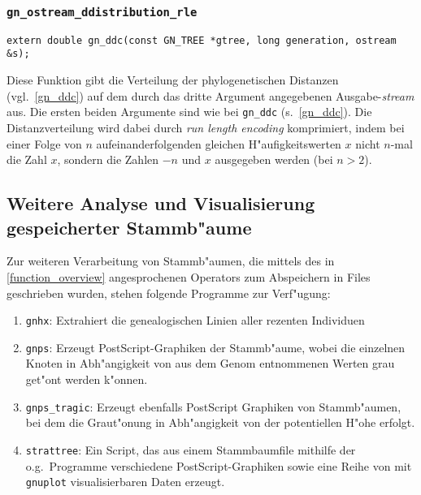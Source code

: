 \documentclass[a4paper, fleqn]{article}
\begin{document}
\subsubsection{\texttt{gn\_ostream\_ddistribution\_rle}}

\begin{verbatim}
extern double gn_ddc(const GN_TREE *gtree, long generation, ostream &s);
\end{verbatim}

Diese Funktion gibt die Verteilung der phylogenetischen Distanzen
(vgl.\ \ref{gn_ddc}) auf dem durch das dritte Argument angegebenen
Ausgabe-\textsl{stream} aus. Die ersten beiden Argumente sind wie bei
\verb|gn_ddc| (s.\ \ref{gn_ddc}). Die Distanzverteilung wird dabei
durch \textsl{run length encoding} komprimiert, indem bei einer Folge
von $n$ aufeinanderfolgenden gleichen H"aufigkeitswerten $x$ nicht
$n$-mal die Zahl $x$, sondern die Zahlen $-n$ und $x$ ausgegeben werden
(bei $n > 2$).


\subsection{Weitere Analyse und Visualisierung gespeicherter Stammb"aume}

Zur weiteren Verarbeitung von Stammb"aumen, die mittels des in \ref{function_overview}
angesprochenen Operators zum Abspeichern in Files geschrieben wurden, stehen folgende
Programme zur Verf"ugung:

\begin{enumerate}

\item \verb|gnhx|: Extrahiert die genealogischen Linien aller rezenten Individuen

\item \verb|gnps|: Erzeugt PostScript-Graphiken der Stammb"aume, wobei die einzelnen
    Knoten in Abh"angigkeit von aus dem Genom entnommenen Werten grau get"ont
    werden k"onnen.

\item \verb|gnps_tragic|: Erzeugt ebenfalls PostScript Graphiken von Stammb"aumen,
    bei dem die Graut"onung in Abh"angigkeit von der potentiellen H"ohe
    erfolgt.

\item \verb|strattree|: Ein Script, das aus einem Stammbaumfile mithilfe der
    o.g.\ Programme verschiedene PostScript-Graphiken sowie eine Reihe von
    mit \verb|gnuplot| visualisierbaren Daten erzeugt.

\end{enumerate}
\end{document}
